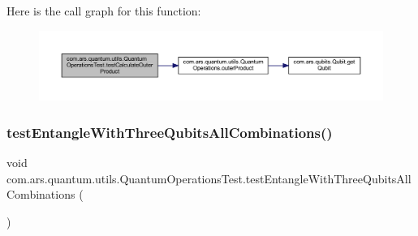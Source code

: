 Here is the call graph for this function\+:\nopagebreak
\begin{figure}[H]
\begin{center}
\leavevmode
\includegraphics[width=350pt]{classcom_1_1ars_1_1quantum_1_1utils_1_1_quantum_operations_test_a7a1cf1c6b0b84064cea27c39c870e470_cgraph}
\end{center}
\end{figure}
\hypertarget{classcom_1_1ars_1_1quantum_1_1utils_1_1_quantum_operations_test_a71ffaf6b899b2a1586f7da357e0517ba}{}\label{classcom_1_1ars_1_1quantum_1_1utils_1_1_quantum_operations_test_a71ffaf6b899b2a1586f7da357e0517ba} 
\subsubsection{\texorpdfstring{test\+Entangle\+With\+Three\+Qubits\+All\+Combinations()}{testEntangleWithThreeQubitsAllCombinations()}}
{\footnotesize\ttfamily void com.\+ars.\+quantum.\+utils.\+Quantum\+Operations\+Test.\+test\+Entangle\+With\+Three\+Qubits\+All\+Combinations (\begin{DoxyParamCaption}{ }\end{DoxyParamCaption})}

